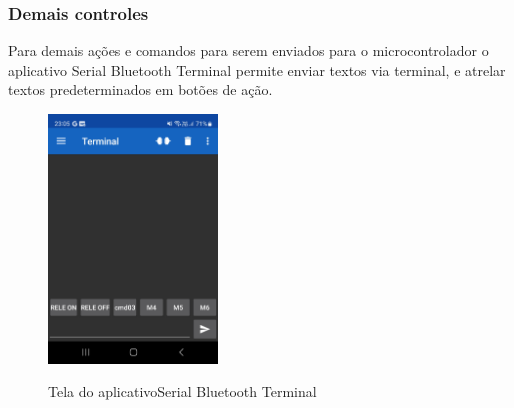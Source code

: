 \subsubsection{Demais controles}

Para demais ações e comandos para serem enviados para o microcontrolador
o aplicativo Serial Bluetooth Terminal permite enviar textos via terminal,
e atrelar textos predeterminados em botões de ação.

\begin{figure}[ht]
	\centering
	\caption{Tela do aplicativoSerial Bluetooth Terminal}
	\includegraphics[width=0.40\textwidth]{figures/serialbluetoothterminal}
	\label{serialbluetoothterminal_tela}
\end{figure}
